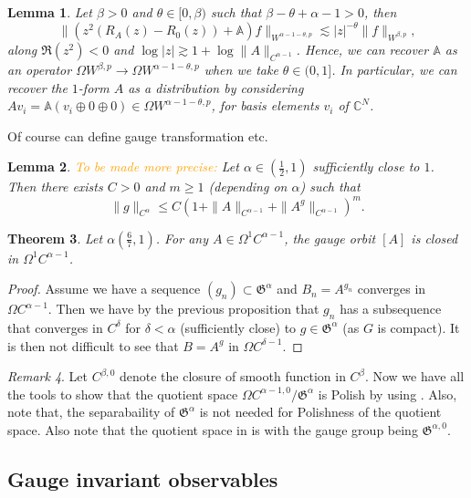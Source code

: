 \documentclass[12pt]{article}
\numberwithin{equation}{section}
\newtheorem{theorem}{Theorem}[section]
\newtheorem{lemma}[theorem]{Lemma}
\theoremstyle{definition}
\theoremstyle{remark}
\newtheorem{remark}[theorem]{Remark}
\newcommand{\1}{\mathbf 1}
\newcommand{\<}{\langle}
\renewcommand{\>}{\rangle}
\newcommand{\orange}[1]{\textcolor{orange}{#1}}
\newcommand{\bA}{\mathbb A}
\newcommand{\fG}{\mathfrak{G}}
\newcommand{\bC}{\mathbb C}
\begin{document}
\begin{lemma}\label{lem:recover_A_Young}
Let $\beta>0$  and $\theta\in [0,\beta)$ such that  $\beta-\theta+\alpha-1>0$, then 
\[
\|(z^2(R_A(z)-R_0(z))+\bA)f\|_{W^{\alpha-1-\theta,p}}\lesssim |z|^{-\theta}\|f\|_{W^{\beta,p}},
\]
along $\Re(z^2)<0$ and $\log |z|\gtrsim 1+\log\|A\|_{C^{\alpha-1}}$. Hence, we can recover $\bA$ as an operator $\Omega W^{\beta,p}\to \Omega W^{\alpha-1-\theta,p}$ when we take $\theta\in(0,1]$. In particular, we can recover the $1$-form $A$ as a distribution by considering $Av_i=\bA(v_i\oplus 0\oplus 0)\in \Omega W^{\alpha-1-\theta,p}$, for basis elements $v_i$ of $\bC^N$. 
\end{lemma}
Of course can define gauge transformation etc. 


\begin{lemma}\orange{To be made more precise:}
 Let $\alpha\in (\frac 12,1)$ sufficiently close to $1$. Then there exists $C>0$ and $m\geq 1$ (depending on $\alpha$) such that 
 \[
 \|g\|_{C^{\alpha}}\leq C(1+\|A\|_{C^{\alpha-1}}+\|A^g\|_{C^{\alpha-1}})^m.
 \]
\end{lemma}

\begin{theorem}
    Let $\alpha(\frac 67,1)$. For any $A\in\Omega^1 C^{\alpha-1}$, the gauge orbit $[A]$ is closed in $\Omega^1 C^{\alpha-1}$. 
\end{theorem}

\begin{proof}
Assume we have a sequence $(g_n)\subset \fG^\alpha$ and $B_n=A^{g_n}$ converges in $\Omega C^{\alpha-1}$. Then we have by the previous proposition that $g_n$ has a subsequence that converges in $C^{\delta}$ for $\delta<\alpha$ (sufficiently close) to $g\in\fG^\alpha$ (as $G$ is compact). It is then not difficult to see that $B=A^g$ in $\Omega C^{\delta-1}$. 
\end{proof}

\begin{remark}
    Let $C^{\beta,0}$ denote the closure of smooth function in $C^\beta$. Now we have all the tools to show that the quotient space $\Omega C^{\alpha-1,0}/\fG^\alpha$ is Polish by using . Also, note that, the separabaility of $\fG^\alpha$ is not needed for Polishness of the quotient space. Also note that the quotient space in \cite{CCHS2d} is with the  gauge group being  $\fG^{\alpha,0}$.  
\end{remark}

\subsection{Gauge invariant observables}
\end{document}
